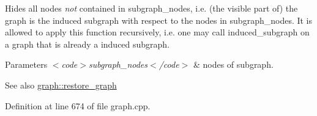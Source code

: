 Hides all nodes {\itshape not} contained in {\ttfamily subgraph\+\_\+nodes}, i.\+e. (the visible part of) the graph is the induced subgraph with respect to the nodes in {\ttfamily subgraph\+\_\+nodes}. It is allowed to apply this function recursively, i.\+e. one may call {\ttfamily induced\+\_\+subgraph} on a graph that is already a induced subgraph.


\begin{DoxyParams}{Parameters}
{\em $<$code$>$subgraph\+\_\+nodes$<$/code$>$} & nodes of subgraph. \\
\hline
\end{DoxyParams}
\begin{DoxySeeAlso}{See also}
\mbox{\hyperlink{classgraph_a53e2a5505fa6427587e12d66e4a86cec}{graph\+::restore\+\_\+graph}} 
\end{DoxySeeAlso}


Definition at line 674 of file graph.\+cpp.


